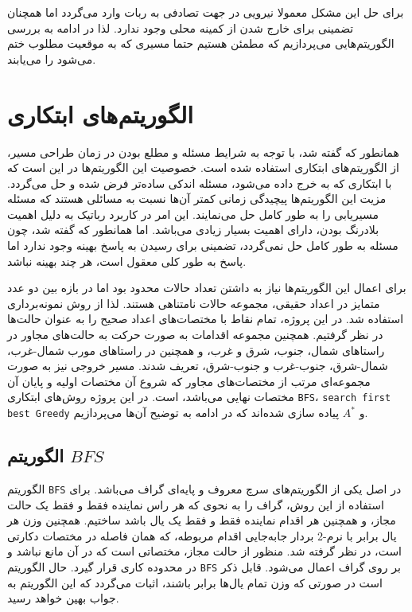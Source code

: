 برای حل این مشکل معمولا نیرویی در جهت تصادفی به ربات وارد می‌گردد اما همچنان تضمینی برای خارج شدن از کمینه محلی وجود ندارد. لذا در ادامه به بررسی الگوریتم‌هایی می‌پردازیم که مطمئن هستیم حتما مسیری که به موقعیت مطلوب ختم می‌شود را می‌یابند.

\section{الگوریتم‌های ابتکاری}
همانطور که گفته شد، با توجه به شرایط مسئله و مطلع بودن در زمان طراحی مسیر، از الگوریتم‌های ابتکاری استفاده شده است. خصوصیت این الگوریتم‌ها در این است که با ابتکاری که به خرج داده می‌شود، مسئله اندکی ساده‌تر فرض شده و حل می‌گردد. مزیت این الگوریتم‌ها پیچیدگی زمانی کمتر آن‌ها نسبت به مسائلی هستند که مسئله مسیریابی را به طور کامل حل می‌نمایند. این امر در کاربرد رباتیک به دلیل اهمیت بلادرنگ بودن، دارای اهمیت بسیار زیادی می‌باشد. اما همانطور که گفته شد، چون مسئله به طور کامل حل نمی‌گردد، تضمینی برای رسیدن به پاسخ بهینه وجود ندارد اما پاسخ به طور کلی معقول است، هر چند بهینه نباشد.

برای اعمال این الگوریتم‌ها نیاز به داشتن تعداد حالات محدود بود اما در بازه بین دو عدد متمایز در اعداد حقیقی، مجموعه حالات نامتناهی هستند. لذا از روش نمونه‌برداری استفاده شد. در این پروژه، تمام نقاط با مختصات‌های اعداد صحیح را به عنوان حالت‌ها در نظر گرفتیم. همچنین مجموعه اقدامات به صورت حرکت به حالت‌های مجاور در راستاهای شمال، جنوب، شرق و غرب، و همچنین در راستاهای مورب شمال-غرب، شمال-شرق، جنوب-غرب و جنوب-شرق، تعریف شدند. مسیر خروجی نیز به صورت مجموعه‌ای مرتب از مختصات‌های مجاور که شروع آن مختصات اولیه و پایان آن مختصات نهایی می‌باشد، است. در این پروژه روش‌های ابتکاری \verb|BFS|، \verb|search first best Greedy| و $A^*$ پیاده سازی شده‌اند که در ادامه به توضیح آن‌ها می‌پردازیم.

\subsection{الگوریتم $BFS$}
الگوریتم \verb|BFS| در اصل یکی از الگوریتم‌های سرچ معروف و پایه‌ای گراف می‌باشد. برای استفاده از این روش، گراف را به نحوی که هر راس نماینده فقط و فقط یک حالت مجاز، و همچنین هر اقدام نماینده فقط و فقط یک یال باشد ساختیم. همچنین وزن هر یال برابر با نرم-2 بردار جابه‌جایی اقدام مربوطه، که همان فاصله در مختصات دکارتی است، در نظر گرفته شد. منظور از حالت مجاز، مختصاتی است که در آن مانع نباشد و در محدوده کاری قرار گیرد. حال الگوریتم \verb|BFS| بر روی گراف اعمال می‌شود. قابل ذکر است در صورتی که وزن تمام یال‌ها برابر باشند، اثبات می‌گردد که این الگوریتم به جواب بهین خواهد رسید.

